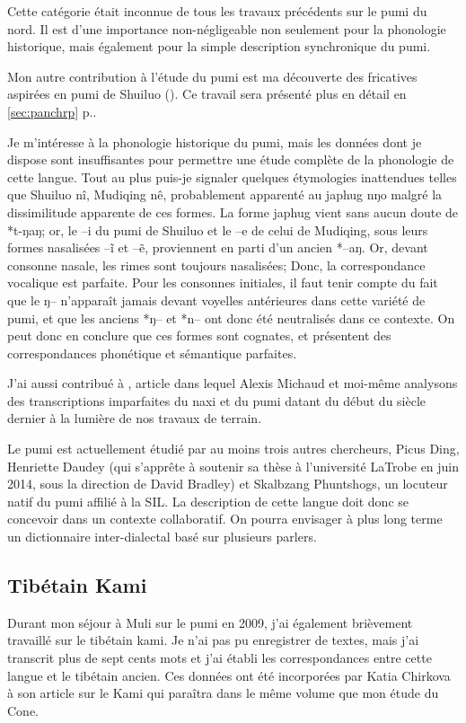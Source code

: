 \documentclass[oldfontcommands,oneside,a4paper,11pt]{memoir}
\newcommand{\ipa}[1]{{\phon #1}} %
\begin{document}
Cette catégorie était inconnue de tous les travaux précédents sur le pumi du nord. Il est d'une importance non-négligeable non seulement pour la phonologie historique, mais également pour la simple description synchronique du pumi.

Mon autre contribution à l'étude du pumi est ma découverte des fricatives aspirées en pumi de Shuiluo (\citealt{jacques11lingua}). Ce travail sera présenté plus en détail en \ref{sec:panchrp} p.\pageref{sec:panchrp}.

Je m'intéresse à la phonologie historique du pumi, mais les données dont je dispose sont insuffisantes pour permettre une étude complète de la phonologie de cette langue. Tout au plus puis-je signaler quelques étymologies inattendues telles que Shuiluo \ipa{nî}, Mudiqing \ipa{nê}, probablement apparenté au japhug \ipa{nŋo} malgré la dissimilitude apparente de ces formes. La forme japhug vient sans aucun doute  de *t-ŋaŋ; or, le --i du pumi de Shuiluo et le --e de celui de Mudiqing, sous leurs formes nasalisées --ĩ et --ẽ, proviennent en parti d'un ancien *--aŋ. Or, devant consonne nasale, les rimes sont toujours nasalisées; Donc, la correspondance vocalique est parfaite. Pour les consonnes initiales, il faut tenir compte du fait que le ŋ-- n'apparaît jamais devant voyelles antérieures dans cette variété de pumi, et que les anciens *ŋ-- et *n-- ont donc été neutralisés dans ce contexte. On peut donc en conclure que ces formes sont cognates, et présentent des correspondances phonétique et sémantique parfaites.

J'ai aussi contribué à \citet{michaud10bonin}, article dans lequel Alexis Michaud et moi-même analysons des transcriptions imparfaites du naxi et du pumi datant du début du siècle dernier à la lumière de nos travaux de terrain.
 


Le pumi est actuellement étudié par au moins trois autres chercheurs, Picus Ding, Henriette Daudey (qui s'apprête à soutenir sa thèse à l'université LaTrobe en juin 2014, sous la direction de David Bradley) et Skalbzang Phuntshogs, un locuteur natif  du pumi affilié à la SIL. La description de cette langue doit donc se concevoir dans un contexte collaboratif. On pourra envisager à plus long terme un dictionnaire inter-dialectal basé sur plusieurs parlers. 

\subsection{Tibétain Kami}
Durant mon séjour à Muli sur le pumi en 2009, j'ai également brièvement travaillé sur le tibétain kami. Je n'ai pas pu enregistrer de textes, mais j'ai transcrit plus de sept cents mots et j'ai établi les correspondances entre cette langue et le tibétain ancien. Ces données ont été incorporées par Katia Chirkova à son article sur le Kami qui paraîtra dans le même volume que mon étude du Cone.
\end{document}
